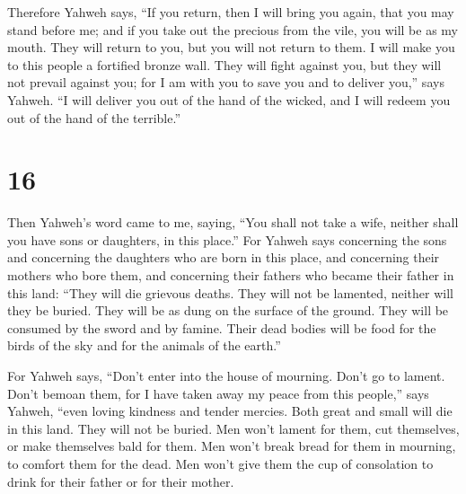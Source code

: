  Therefore Yahweh says, ``If you return, then I will
bring you again, that you may stand before me; and if you take out the
precious from the vile, you will be as my mouth. They will return to
you, but you will not return to them.  I will make you to
this people a fortified bronze wall. They will fight against you, but
they will not prevail against you; for I am with you to save you and to
deliver you,'' says Yahweh.  ``I will deliver you out of
the hand of the wicked, and I will redeem you out of the hand of the
terrible.''

\hypertarget{section-15}{%
\section{16}\label{section-15}}

 Then Yahweh's word came to me, saying, 
``You shall not take a wife, neither shall you have sons or daughters,
in this place.''  For Yahweh says concerning the sons and
concerning the daughters who are born in this place, and concerning
their mothers who bore them, and concerning their fathers who became
their father in this land:  ``They will die grievous
deaths. They will not be lamented, neither will they be buried. They
will be as dung on the surface of the ground. They will be consumed by
the sword and by famine. Their dead bodies will be food for the birds of
the sky and for the animals of the earth.''

 For Yahweh says, ``Don't enter into the house of
mourning. Don't go to lament. Don't bemoan them, for I have taken away
my peace from this people,'' says Yahweh, ``even loving kindness and
tender mercies.  Both great and small will die in this
land. They will not be buried. Men won't lament for them, cut
themselves, or make themselves bald for them.  Men won't
break bread for them in mourning, to comfort them for the dead. Men
won't give them the cup of consolation to drink for their father or for
their mother.

